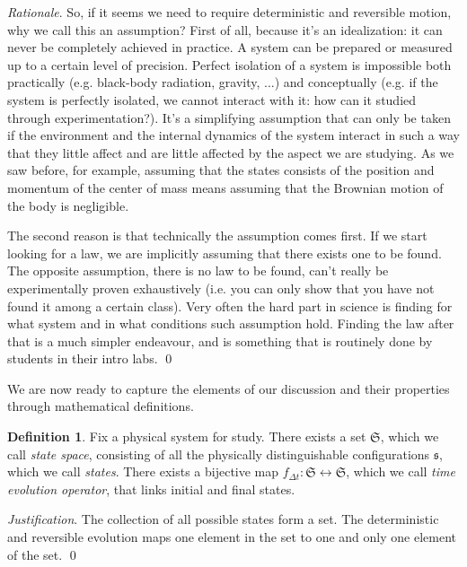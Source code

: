 \documentclass[aps,pra,10pt,twocolumn,floatfix,nofootinbib]{revtex4-1}
\theoremstyle{definition}
\newtheorem{defn}[prop]{Definition}
\newenvironment{rationale}{\emph{Rationale}.}{\qed}
\newenvironment{justification}{\emph{Justification}.}{\qed}
\begin{document}
\begin{rationale}
So, if it seems we need to require deterministic and reversible motion, why we call this an assumption? First of all, because it's an idealization: it can never be completely achieved in practice. A system can be prepared or measured up to a certain level of precision. Perfect isolation of a system is impossible both practically (e.g. black-body radiation, gravity, ...) and conceptually (e.g. if the system is perfectly isolated, we cannot interact with it: how can it studied through experimentation?). It's a simplifying assumption that can only be taken if the environment and the internal dynamics of the system interact in such a way that they little affect and are little affected by the aspect we are studying. As we saw before, for example, assuming that the states consists of the position and momentum of the center of mass means assuming that the Brownian motion of the body is negligible.

The second reason is that technically the assumption comes first. If we start looking for a law, we are implicitly assuming that there exists one to be found. The opposite assumption, there is no law to be found, can't really be experimentally proven exhaustively (i.e. you can only show that you have not found it among a certain class). Very often the hard part in science is finding for what system and in what conditions such assumption hold. Finding the law after that is a much simpler endeavour, and is something that is routinely done by students in their intro labs.
\end{rationale}

We are now ready to capture the elements of our discussion and their properties through mathematical definitions.

\begin{defn}\label{statedef}
Fix a physical system for study. There exists a set $\mathfrak{S}$, which we call \emph{state space}, consisting of all the physically distinguishable configurations $\mathfrak{s}$, which we call \emph{states}. There exists a bijective map $f_{\Delta t}:\mathfrak{S} \leftrightarrow \mathfrak{S}$, which we call \emph{time evolution operator}, that links initial and final states.
\end{defn}

\begin{justification}
The collection of all possible states form a set. The deterministic and reversible evolution maps one element in the set to one and only one element of the set.
\end{justification}
\end{document}
